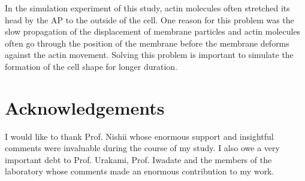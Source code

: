 \documentclass[a4paper,12pt, oneside]{book}
\begin{document}
In the simulation experiment of this study, actin molecules often stretched its head by the AP to the outside of the cell.
One reason for this problem was the slow propagation of the displacement of membrane particles and actin molecules often go through the position of the membrane before the membrane deforms against the actin movement.
Solving this problem is important to simulate the formation of the cell shape for longer duration.


\chapter*{Acknowledgements}
I would like to thank Prof. Nishii whose enormous support and insightful comments were invaluable during the course of my study. I also owe a very important debt to Prof. Urakami, Prof. Iwadate and the members of the laboratory whose comments made an enormous contribution to my work. 




\end{document}
